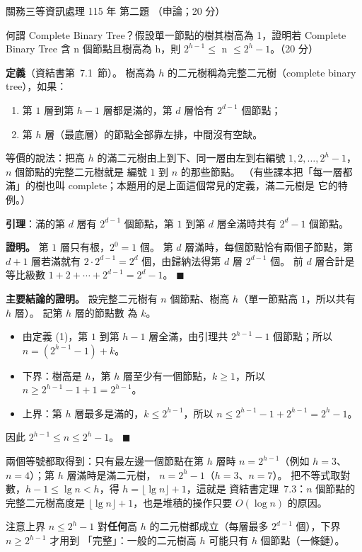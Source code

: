 \begin{pastexam}[label={px:gw3-115-ds-02}]{關務三等資訊處理 115 年 第二題}
（申論；20 分）

何謂 Complete Binary Tree？假設單一節點的樹其樹高為 1，證明若 Complete Binary Tree 含 n 個節點且樹高為 h，則
$2^{h-1} \le$ n $\le 2^h - 1$。（20 分）
\end{pastexam}

\begin{pastsoln}
\textbf{定義}（資結書第~7.1~節）。 樹高為 $h$ 的二元樹稱為完整二元樹（complete binary tree），如果：
\begin{enumerate}[label=(\arabic*)]
\item 第 $1$ 層到第 $h - 1$ 層都是滿的，第 $d$ 層恰有 $2^{d-1}$ 個節點；
\item 第 $h$ 層（最底層）的節點全部靠左排，中間沒有空缺。
\end{enumerate}
等價的說法：把高 $h$ 的滿二元樹由上到下、同一層由左到右編號 $1, 2, \ldots, 2^h - 1$，$n$ 個節點的完整二元樹就是
編號 $1$ 到 $n$ 的那些節點。 （有些課本把「每一層都滿」的樹也叫 complete；本題用的是上面這個常見的定義，滿二元樹是
它的特例。）

\textbf{引理}：滿的第 $d$ 層有 $2^{d-1}$ 個節點，第 $1$ 到第 $d$ 層全滿時共有 $2^d - 1$ 個節點。

\textbf{證明。} 第 $1$ 層只有根，$2^0 = 1$ 個。 第 $d$ 層滿時，每個節點恰有兩個子節點，第 $d + 1$ 層若滿就有
$2 \cdot 2^{d-1} = 2^d$ 個，由歸納法得第 $d$ 層 $2^{d-1}$ 個。 前 $d$ 層合計是等比級數
$1 + 2 + \cdots + 2^{d-1} = 2^d - 1$。 \hfill$\blacksquare$

\textbf{主要結論的證明。} 設完整二元樹有 $n$ 個節點、樹高 $h$（單一節點高 $1$，所以共有 $h$ 層）。 記第 $h$ 層的節點數
為 $k$。
\begin{itemize}
\item 由定義 (1)，第 $1$ 到第 $h - 1$ 層全滿，由引理共 $2^{h-1} - 1$ 個節點；所以 $n = (2^{h-1} - 1) + k$。
\item 下界：樹高是 $h$，第 $h$ 層至少有一個節點，$k \ge 1$，所以 $n \ge 2^{h-1} - 1 + 1 = 2^{h-1}$。
\item 上界：第 $h$ 層最多是滿的，$k \le 2^{h-1}$，所以 $n \le 2^{h-1} - 1 + 2^{h-1} = 2^h - 1$。
\end{itemize}
因此 $2^{h-1} \le n \le 2^h - 1$。 \hfill$\blacksquare$

兩個等號都取得到：只有最左邊一個節點在第 $h$ 層時 $n = 2^{h-1}$（例如 $h = 3$、$n = 4$）；第 $h$ 層滿時是滿二元樹，
$n = 2^h - 1$（$h = 3$、$n = 7$）。 把不等式取對數，$h - 1 \le \lg n < h$，得 $h = \lfloor \lg n \rfloor + 1$，這就是
資結書定理~7.3：$n$ 個節點的完整二元樹高度是 $\lfloor \lg n \rfloor + 1$，也是堆積的操作只要 $O(\log n)$ 的原因。

注意上界 $n \le 2^h - 1$ 對\textbf{任何}高 $h$ 的二元樹都成立（每層最多 $2^{d-1}$ 個），下界 $n \ge 2^{h-1}$ 才用到
「完整」：一般的二元樹高 $h$ 可能只有 $h$ 個節點（一條鏈）。
\end{pastsoln}

